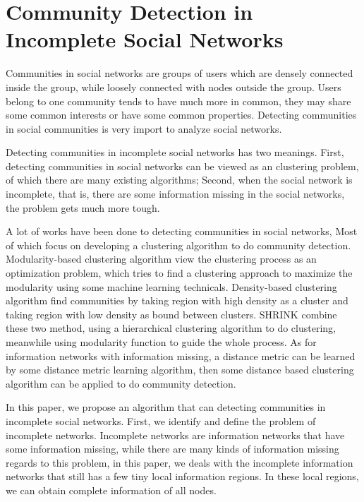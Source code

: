 \chapter[英文大摘要]{Community Detection in Incomplete Social Networks}
\label{chap:longabstract}

Communities in social networks are groups of users which are densely
connected inside the group, while loosely connected with nodes outside the group.
Users belong to one community tends to have much more in common, 
they may share some common interests or have some common properties.
Detecting communities in social communities is very import to analyze
social networks.

Detecting communities in incomplete social networks has two meanings.
First, detecting communities in social networks can be viewed as an clustering problem,
of which there are many existing algorithms; 
Second, when the social network is incomplete, that is, there are some information missing
in the social networks, the problem gets much more tough.

A lot of works have been done to detecting communities in social networks,
Most of which focus on developing a clustering algorithm to do community detection.
Modularity-based clustering algorithm view the clustering process as an optimization problem,
which tries to find a clustering approach to maximize the modularity using some machine learning technicals. 
Density-based clustering algorithm find communities by taking region with high density as a cluster and 
taking region with low density as bound between clusters.
SHRINK combine these two method, using a hierarchical clustering algorithm to do clustering, meanwhile 
using modularity function to guide the whole process.
As for information networks with information missing, 
a distance metric can be learned by some distance metric learning algorithm,
then some distance based clustering algorithm can be applied to do community detection.

In this paper, we propose an algorithm that can detecting communities in incomplete social networks.
First, we identify and define the problem of incomplete networks.
Incomplete networks are information networks that have some information missing,
while there are many kinds of information missing regards to this problem,
in this paper, we deals with the incomplete information networks that still
has a few tiny local information regions. In these local regions, we can obtain
complete information of all nodes.


